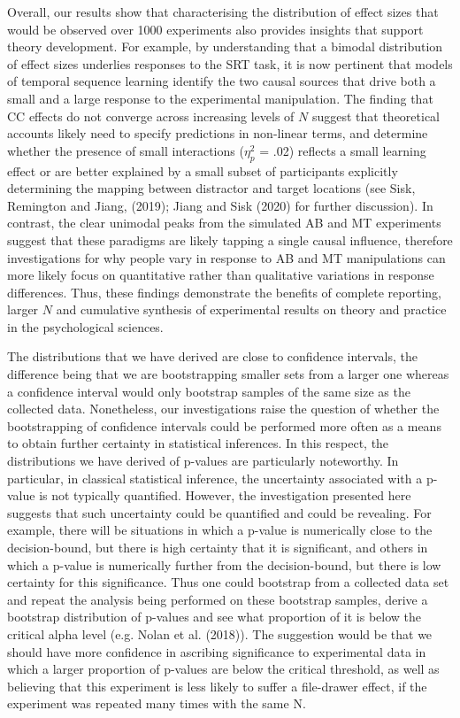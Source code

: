 \documentclass{article}
\begin{document}
Overall, our results show that characterising the distribution of effect sizes that would be observed over 1000 experiments also provides insights that support theory development. For example, by understanding that a bimodal distribution of effect sizes underlies responses to the SRT task, it is now pertinent that models of temporal sequence learning identify the two causal sources that drive both a small and a large response to the experimental manipulation. The finding that CC effects do not converge across increasing levels of \(N\) suggest that theoretical accounts likely need to specify predictions in non-linear terms, and determine whether the presence of small interactions (\(\eta_{p}^2\) = .02) reflects a small learning effect or are better explained by a small subset of participants explicitly determining the mapping between distractor and target locations (see Sisk, Remington and Jiang, (2019); Jiang and Sisk (2020) for further discussion). In contrast, the clear unimodal peaks from the simulated AB and MT experiments suggest that these paradigms are likely tapping a single causal influence, therefore investigations for why people vary in response to AB and MT manipulations can more likely focus on quantitative rather than qualitative variations in response differences. Thus, these findings demonstrate the benefits of complete reporting, larger \(N\) and cumulative synthesis of experimental results on theory and practice in the psychological sciences.

The distributions that we have derived are close to confidence intervals, the difference being that we are bootstrapping smaller sets from a larger one whereas a confidence interval would only bootstrap samples of the same size as the collected data. Nonetheless, our investigations raise the question of whether the bootstrapping of confidence intervals could be performed more often as a means to obtain further certainty in statistical inferences. In this respect, the distributions we have derived of p-values are particularly noteworthy. In particular, in classical statistical inference, the uncertainty associated with a p-value is not typically quantified. However, the investigation presented here suggests that such uncertainty could be quantified and could be revealing. For example, there will be situations in which a p-value is numerically close to the decision-bound, but there is high certainty that it is significant, and others in which a p-value is numerically further from the decision-bound, but there is low certainty for this significance. Thus one could bootstrap from a collected data set and repeat the analysis being performed on these bootstrap samples, derive a bootstrap distribution of p-values and see what proportion of it is below the critical alpha level (e.g. Nolan et al. (2018)). The suggestion would be that we should have more confidence in ascribing significance to experimental data in which a larger proportion of p-values are below the critical threshold, as well as believing that this experiment is less likely to suffer a file-drawer effect, if the experiment was repeated many times with the same N.
\end{document}
